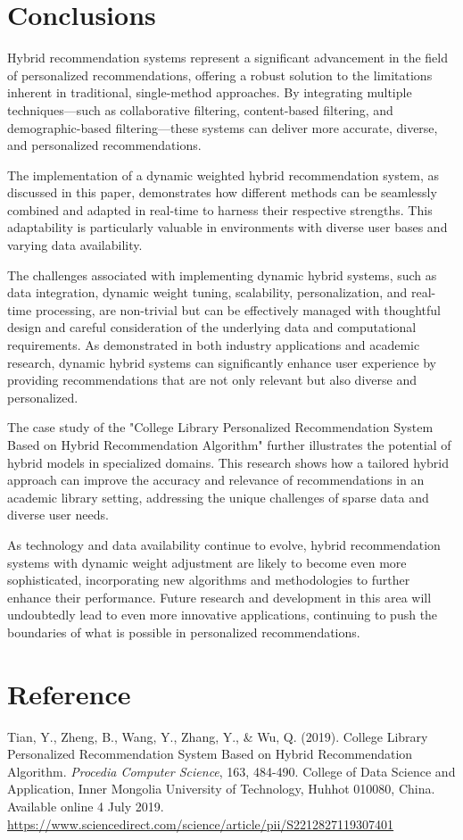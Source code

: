 \documentclass{article}
\begin{document}
\section{Conclusions}

Hybrid recommendation systems represent a significant advancement in the field of personalized recommendations, offering a robust solution to the limitations inherent in traditional, single-method approaches. By integrating multiple techniques—such as collaborative filtering, content-based filtering, and demographic-based filtering—these systems can deliver more accurate, diverse, and personalized recommendations.

The implementation of a dynamic weighted hybrid recommendation system, as discussed in this paper, demonstrates how different methods can be seamlessly combined and adapted in real-time to harness their respective strengths. This adaptability is particularly valuable in environments with diverse user bases and varying data availability.

The challenges associated with implementing dynamic hybrid systems, such as data integration, dynamic weight tuning, scalability, personalization, and real-time processing, are non-trivial but can be effectively managed with thoughtful design and careful consideration of the underlying data and computational requirements. As demonstrated in both industry applications and academic research, dynamic hybrid systems can significantly enhance user experience by providing recommendations that are not only relevant but also diverse and personalized.

The case study of the "College Library Personalized Recommendation System Based on Hybrid Recommendation Algorithm" further illustrates the potential of hybrid models in specialized domains. This research shows how a tailored hybrid approach can improve the accuracy and relevance of recommendations in an academic library setting, addressing the unique challenges of sparse data and diverse user needs.

As technology and data availability continue to evolve, hybrid recommendation systems with dynamic weight adjustment are likely to become even more sophisticated, incorporating new algorithms and methodologies to further enhance their performance. Future research and development in this area will undoubtedly lead to even more innovative applications, continuing to push the boundaries of what is possible in personalized recommendations.

\section{Reference}

Tian, Y., Zheng, B., Wang, Y., Zhang, Y., \& Wu, Q. (2019). College Library Personalized Recommendation System Based on Hybrid Recommendation Algorithm. \textit{Procedia Computer Science}, 163, 484-490. College of Data Science and Application, Inner Mongolia University of Technology, Huhhot 010080, China. Available online 4 July 2019. \url{https://www.sciencedirect.com/science/article/pii/S2212827119307401}
\end{document}
